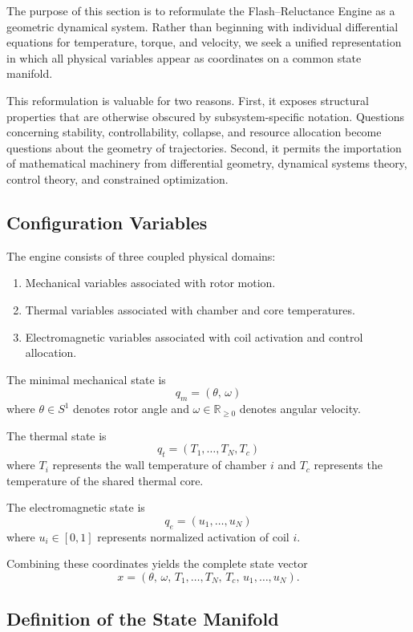 \documentclass[12pt,a4paper]{article}
\begin{document}
The purpose of this section is to reformulate the Flash--Reluctance Engine as a geometric dynamical system. Rather than beginning with individual differential equations for temperature, torque, and velocity, we seek a unified representation in which all physical variables appear as coordinates on a common state manifold.

This reformulation is valuable for two reasons. First, it exposes structural properties that are otherwise obscured by subsystem-specific notation. Questions concerning stability, controllability, collapse, and resource allocation become questions about the geometry of trajectories. Second, it permits the importation of mathematical machinery from differential geometry, dynamical systems theory, control theory, and constrained optimization.

\subsection{Configuration Variables}

The engine consists of three coupled physical domains:
\begin{enumerate}
\item Mechanical variables associated with rotor motion.
\item Thermal variables associated with chamber and core temperatures.
\item Electromagnetic variables associated with coil activation and control allocation.
\end{enumerate}

The minimal mechanical state is
\[
q_m = (\theta,\, \omega)
\]
where $\theta \in S^1$ denotes rotor angle and $\omega \in \mathbb{R}_{\ge 0}$ denotes angular velocity.

The thermal state is
\[
q_t = (T_1, \ldots, T_N, T_c)
\]
where $T_i$ represents the wall temperature of chamber $i$ and $T_c$ represents the temperature of the shared thermal core.

The electromagnetic state is
\[
q_e = (u_1, \ldots, u_N)
\]
where $u_i \in [0,1]$ represents normalized activation of coil $i$.

Combining these coordinates yields the complete state vector
\[
x = (\theta,\, \omega,\, T_1, \ldots, T_N,\, T_c,\, u_1, \ldots, u_N).
\]

\subsection{Definition of the State Manifold}
\end{document}
